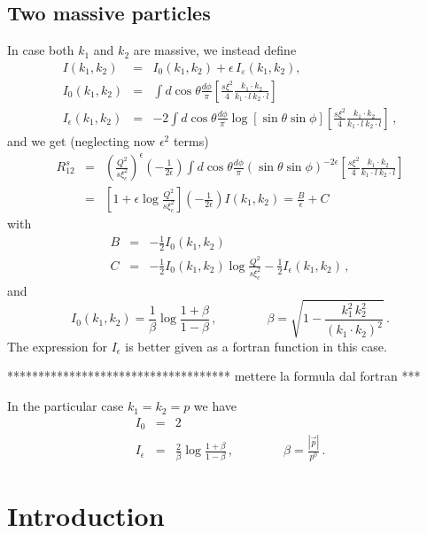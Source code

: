 \documentclass[paper]{JHEP3}
\def\({\left(}
\def\){\right)}
\def\beqn{\begin{eqnarray}}
\def\eeqn{\end{eqnarray}}
\begin{document}
\subsection{Two massive  particles}
In case both $k_1$ and $k_2$ are massive, we instead define
\begin{eqnarray}
  I (k_1, k_2) &=& I_0 (k_1, k_2) + \epsilon \, I_{\varepsilon} (k_1, k_2),
\\
  I_0 (k_1, k_2) &=& \int d \cos \theta \frac{d \phi}{\pi}  \left[ \frac{s
  \xi^2}{4} \frac{k_1 \cdot k_2}{k_1 \cdot l \ k_2 \cdot l} \right] 
\\
  I_{\epsilon} (k_1, k_2) &=& - 2 \int d \cos \theta \frac{d \phi}{\pi} \log
  [\sin \theta \sin \phi] \left[ \frac{s \xi^2}{4} \frac{k_1 \cdot k_2}{k_1
  \cdot l \ k_2 \cdot l} \right] \,,
\end{eqnarray}
and we get (neglecting now $\epsilon^2$ terms)
\begin{eqnarray}
  R^s_{12} & = & \left( \frac{Q^2}{s \xi_c^2} \right)^{\epsilon} \left(
  -\frac{1}{2 \epsilon} \right) \int d \cos \theta \frac{d \phi}{\pi} (\sin
  \theta \sin \phi)^{- 2 \epsilon}  \left[ \frac{s \xi^2}{4} \frac{k_1 \cdot
  k_2}{k_1 \cdot l\ k_2 \cdot l} \right] \nonumber\\
  & = & \left[ 1 + \epsilon \log \frac{Q^2}{s \xi_c^2} \right]
  \(-\frac{1}{2\epsilon}\) I(k_1, k_2) = \frac{B}{\epsilon} + C 
\end{eqnarray}
with
\begin{eqnarray}
  B & = & - \frac{1}{2} I_0 (k_1, k_2) \\
  C & = & - \frac{1}{2} I_0 (k_1, k_2) \log \frac{Q^2}{s \xi_c^2} -
  \frac{1}{2} I_{\epsilon} (k_1, k_2)\,, 
\end{eqnarray}
and
\begin{equation}
  I_0 (k_1, k_2) = \frac{1}{\beta} \log \frac{1 + \beta}{1 - \beta}\,, 
\qquad\qquad \beta = \sqrt{1 - \frac{k_1^2\, k_2^2}{(k_1 \cdot k_2)^2}}\,.
\end{equation}
The expression for $I_{\epsilon}$ is better given as a fortran function in
this case.

************************************  mettere la formula dal fortran  ***

In the particular case $k_1 = k_2 = p$ we have
\beqn
  I_0 &=& 2\\
  I_{\epsilon} &=& \frac{2}{\beta} \log \frac{1 + \beta}{1 - \beta}\,, 
\qquad\qquad \beta =  \frac{| \vec{p} |}{p^0}\, .
\eeqn

\section{Introduction}
\end{document}

